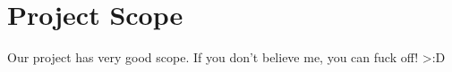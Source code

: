 \section{Project Scope}

Our project has very good scope. If you don't believe me,
you can fuck off! >:D
